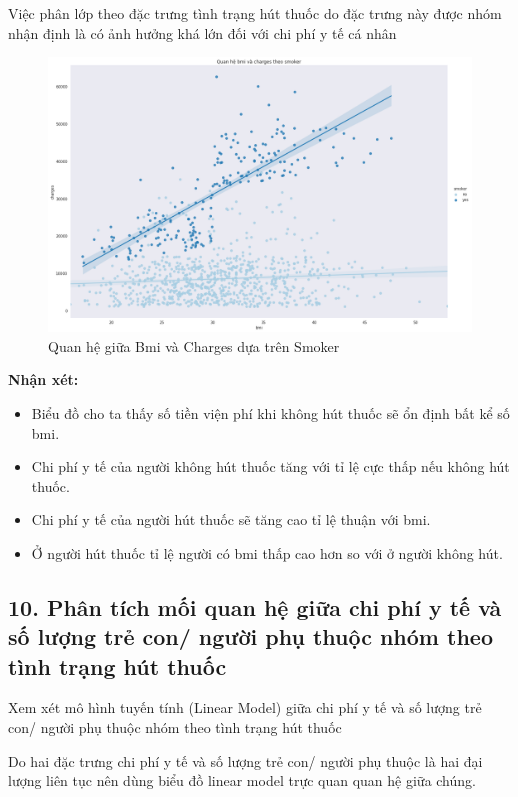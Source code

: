 \documentclass{article}
\begin{document}
	Việc phân lớp theo đặc trưng tình trạng hút thuốc do đặc trưng này được nhóm nhận định là có ảnh hưởng khá lớn đối với chi phí y tế cá nhân
	\begin{figure}[H]
		\centering
		\includegraphics[width=1\textwidth]{images/bmi_charges_by_smoker.png}
		\caption{Quan hệ giữa Bmi và Charges dựa trên Smoker}
		\label{fig:writing-thesis-linear-model-medical-charges-bmi-group-smoker}
	\end{figure}
	\textbf{Nhận xét:} 
	\begin{itemize}
		\item Biểu đồ cho ta thấy số tiền viện phí khi không hút thuốc sẽ ổn định bất kể số bmi.
		\item Chi phí y tế của người không hút thuốc tăng với tỉ lệ cực thấp nếu không hút thuốc.
		\item Chi phí y tế của người hút thuốc sẽ tăng cao tỉ lệ thuận với bmi.
		\item Ở người hút thuốc tỉ lệ người có bmi thấp cao hơn so với ở người không hút.
	\end{itemize}

	\subsection{10. Phân tích  mối quan hệ giữa chi phí y tế và số lượng trẻ con/ người phụ thuộc nhóm theo tình trạng hút thuốc}
	\qquad Xem xét mô hình tuyến tính (Linear Model) giữa  chi phí y tế và số lượng trẻ con/ người phụ thuộc nhóm theo tình trạng hút thuốc
	
	Do hai đặc trưng chi phí y tế và số lượng trẻ con/ người phụ thuộc là hai đại lượng liên tục nên dùng biểu đồ linear model trực quan quan hệ giữa chúng.
	
\end{document}
